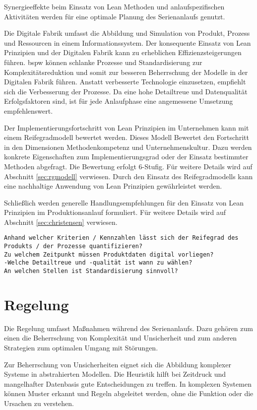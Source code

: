 Synergieeffekte beim Einsatz von Lean Methoden und anlaufspezifischen Aktivitäten werden für eine optimale Planung des Serienanlaufs genutzt. 

Die Digitale Fabrik umfasst die Abbildung und Simulation von Produkt, Prozess und Ressourcen in einem Informationssystem. 
Der konsequente Einsatz von Lean Prinzipien und der Digitalen Fabrik kann zu erheblichen Effizienzsteigerungen führen. \Gls{bspw} können schlanke Prozesse und Standardisierung zur Komplexitätsreduktion und somit zur besseren Beherrschung der Modelle in der Digitalen Fabrik führen. Anstatt verbesserte Technologie einzusetzen, empfiehlt sich die Verbesserung der Prozesse. Da eine hohe Detailtreue und Datenqualität Erfolgsfaktoren sind, ist für jede Anlaufphase eine angemessene Umsetzung empfehlenswert. 

Der Implementierungsfortschritt von Lean Prinzipien im Unternehmen kann mit einem Reifegradmodell bewertet werden. Dieses Modell Bewertet den Fortschritt in den Dimensionen Methodenkompetenz und Unternehmenskultur. Dazu werden konkrete Eigenschaften zum Implementierungsgrad oder der Einsatz bestimmter Methoden abgefragt. Die Bewertung erfolgt 6-Stufig. Für weitere Details wird auf Abschnitt \ref{sec:rgmodell} verwiesen. Durch den Einsatz des Reifegradmodells kann eine nachhaltige Anwendung von Lean Prinzipien gewährleistet werden. 

Schließlich werden generelle Handlungsempfehlungen für den Einsatz von Lean Prinzipien im Produktionsanlauf formuliert. Für weitere Details wird auf Abschnitt \ref{sec:christensen} verwiesen.

\begin{verbatim}
Anhand welcher Kriterien / Kennzahlen lässt sich der Reifegrad des 
Produkts / der Prozesse quantifizieren? 
Zu welchem Zeitpunkt müssen Produktdaten digital vorliegen? 
-Welche Detailtreue und -qualität ist wann zu wählen?
An welchen Stellen ist Standardisierung sinnvoll? 
\end{verbatim}

\section{Regelung}

Die Regelung umfasst Maßnahmen während des Serienanlaufs. Dazu gehören zum einen die Beherrschung von Komplexität und Unsicherheit und zum anderen Strategien zum optimalen Umgang mit Störungen. 

Zur Beherrschung von Unsicherheiten eignet sich die Abbildung komplexer Systeme in abstrahierten Modellen. Die Heuristik hilft bei Zeitdruck und mangelhafter Datenbasis gute Entscheidungen zu treffen. In komplexen Systemen können Muster erkannt und Regeln abgeleitet werden, ohne die Funktion oder die Ursachen zu verstehen. 

